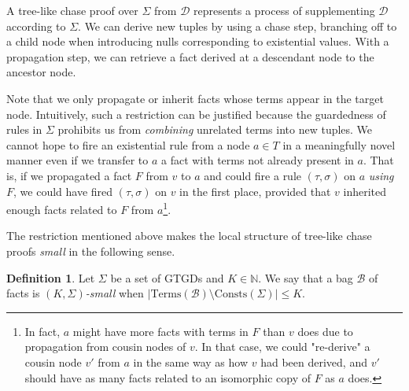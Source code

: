 \documentclass[12pt]{report}
\theoremstyle{plain}
\theoremstyle{definition}
\newtheorem{definition}[theorem]{Definition}
\def\Consts{{\mathrm{Consts}}}
\def\Terms{{\mathrm{Terms}}}
\begin{document}
A tree-like chase proof over $\Sigma$ from $\mathcal{D}$ represents a process of supplementing $\mathcal{D}$ according to $\Sigma$. We can derive new tuples by using a chase step, branching off to a child node when introducing nulls corresponding to existential values. With a propagation step, we can retrieve a fact derived at a descendant node to the ancestor node.

Note that we only propagate or inherit facts whose terms appear in the target node. Intuitively, such a restriction can be justified because the guardedness of rules in $\Sigma$ prohibits us from \emph{combining} unrelated terms into new tuples. We cannot hope to fire an existential rule from a node $a \in T$ in a meaningfully novel manner even if we transfer to $a$ a fact with terms not already present in $a$. That is, if we propagated a fact $F$ from $v$ to $a$ and could fire a rule $(\tau, \sigma)$ on $a$ \emph{using} $F$, we could have fired $(\tau, \sigma)$ on $v$ in the first place, provided that $v$ inherited enough facts related to $F$ from $a$\footnote{In fact, $a$ might have more facts with terms in $F$ than $v$ does due to propagation from cousin nodes of $v$. In that case, we could "re-derive" a cousin node $v'$ from $a$ in the same way as how $v$ had been derived, and $v'$ should have as many facts related to an isomorphic copy of $F$ as $a$ does.}.


The restriction mentioned above makes the local structure of tree-like chase proofs \emph{small} in the following sense.

\begin{definition}
  Let $\Sigma$ be a set of GTGDs and $K \in \mathbb{N}$. We say that a bag $\mathcal{B}$ of facts is \emph{$(K, \Sigma)$-small} when $|\Terms(\mathcal{B}) \setminus \Consts(\Sigma)| \leq K$.
\end{definition}
\end{document}
